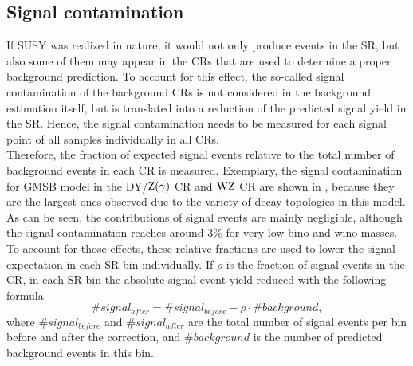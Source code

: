 \subsection{Signal contamination}\label{sec:signalCont}
If SUSY was realized in nature, it would not only produce events in the SR, but also some of them may appear in the CRs that are used to determine a proper background prediction. To account for this effect, the so-called signal contamination of the background CRs is not considered in the background estimation itself, but is translated into a reduction of the predicted signal yield in the SR. Hence, the signal contamination needs to be measured for each signal point of all samples individually in all CRs.\\
Therefore, the fraction of expected signal events relative to the total number of background events in each CR is measured.
Exemplary, the signal contamination for GMSB model in the DY/$\mathrm{Z}(\gamma)$ CR and $\mathrm{W}\mathrm{Z}$ CR are shown in , because they are the largest ones observed due to the variety of decay topologies in this model. As can be seen, the contributions of signal events are mainly negligible, although the signal contamination reaches around $3\%$ for very low bino and wino masses.\\
To account for those effects, these relative fractions are used to lower the signal expectation in each SR bin individually. If $\rho$ is the fraction of signal events in the CR, in each SR bin the absolute signal event yield reduced with the following formula
\begin{equation}
 \#signal_{after} = \#signal_{before} - \rho\cdot\#background,
\end{equation}
where $\#signal_{before}$ and $\#signal_{after}$ are the total number of signal events per bin before and after the correction, and $\#background$ is the number of predicted background events in this bin.

